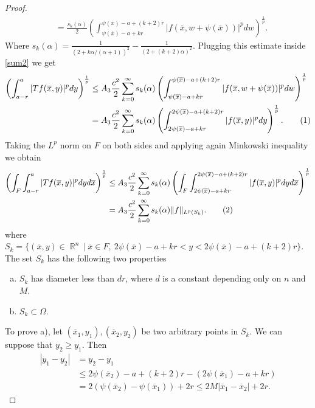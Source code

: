 \documentclass[12pt]{article}
\theoremstyle{definition}
\DeclareMathOperator\rr{\mathbb{R}}
\newcommand\addtag{\refstepcounter{equation}\tag{\theequation}}
\begin{document}
\begin{proof}
\begin{align*}
&=\frac{s_k(\alpha)}{2} \left ( \int_{\psi(\overline x)-a+kr}^{\psi(\overline x)-a+(k+2)r}|f(\overline x, w+\psi(\overline x))|^p  dw \right) ^{\frac{1}{p}}.
\end{align*}
Where $s_k(\alpha)=\frac{1}{(2+k\alpha/(\alpha+1))^2} -\frac{1}{(2+(k+2)\alpha)^2}.$ Plugging this estimate inside \eqref{sum2} we get
\begin{align*}
 \left(\int_{a-r}^{a}|Tf(\overline x,y)|^p dy\right)^{\frac{1}{p}} &\le A_3\frac{c^2}{2} \sum_{k=0}^\infty s_k(\alpha) \left ( \int_{\psi(\overline x) -a+kr}^{\psi(\overline x) -a+(k+2)r}|f(\overline x, w+\psi(\overline x))|^p  dw \right) ^{\frac{1}{p}} \\
&= A_3\frac{c^2}{2} \sum_{k=0}^\infty s_k(\alpha) \left ( \int_{2\psi(\overline x) -a+kr}^{2\psi(\overline x) -a+(k+2)r}|f(\overline x, y)|^p  dy \right) ^{\frac{1}{p}}. \addtag \label{sum3}\\
\end{align*}
Taking the $L^p$ norm on $F$ on both sides and applying again Minkowski inequality we obtain
\begin{align*}
\left(\int_F\int_{a-r}^{a}|Tf(\overline x,y)|^p dy d\overline x\right)^{\frac{1}{p}} &\le A_3 \frac{c^2}{2} \sum_{k=0}^\infty s_k(\alpha) \left (\int_F \int_{2\psi(\overline x) -a+kr}^{2\psi(\overline x) -a+(k+2)r}|f(\overline x, y)|^p  dy d\overline x\right) ^{\frac{1}{p}}\\
&=A_3 \frac{c^2}{2} \sum_{k=0}^\infty s_k(\alpha) \|f\|_{L^p(S_k)}. \addtag \label{finalsum}\\
\end{align*}
where $S_k=\{ (\overline x, y) \in \rr^n \ | \ \overline x \in F ,\  2\psi(\overline x) -a+kr < y < 2\psi(\overline x) -a+(k+2)r \}$. The set $S_k$ has the following two properties 
\begin{enumerate}[a)]
 	\item $S_k$ has diameter less than $dr$, where $d$ is a constant depending only on $n$ and $M$.
 	\item $S_k \subset \Omega$.
 \end{enumerate}  To prove a), let $(\overline x_1,y_1),(\overline x_2,y_2)$ be two arbitrary points in $S_k$. We can suppose that $y_2\ge y_1.$ Then 
\begin{align*}
|y_1-y_2|&=y_2-y_1 \\
		&\le2\psi(\overline x_2)-a+(k+2)r -(2\psi(\overline x_1) -a+kr) \\
		&=2 (\psi(\overline x_2)-\psi(\overline x_1))+2r\le 2M|\overline x_1 - \overline x_2|+2r.
\end{align*}

\end{proof}
\end{document}

